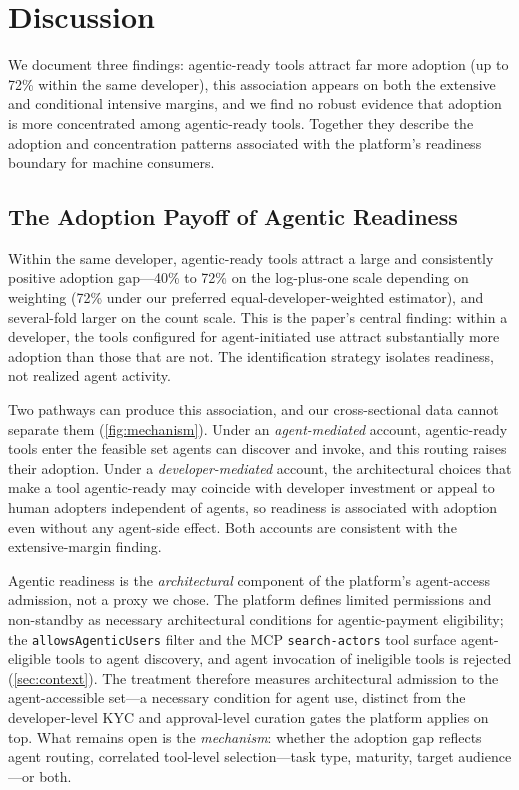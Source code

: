 \section{Discussion}
\label{sec:discussion}

We document three findings: agentic-ready tools attract far more adoption
(up to 72\% within the same developer), this association appears on both the
extensive and conditional intensive margins, and we find no robust evidence
that adoption is more concentrated among agentic-ready tools. Together they
describe the adoption and concentration patterns associated with the platform's
readiness boundary for machine consumers.

\subsection{The Adoption Payoff of Agentic Readiness}
\label{sec:discussion:gap}

Within the same developer, agentic-ready tools attract a large and consistently
positive adoption gap---40\% to 72\% on the log-plus-one scale depending on
weighting (72\% under our preferred equal-developer-weighted estimator), and
several-fold larger on the count scale. This is the paper's central finding:
within a developer, the tools configured for agent-initiated use attract
substantially more adoption
than those that are not. The identification strategy isolates readiness, not realized agent activity.

Two pathways can produce this association, and our cross-sectional data cannot
separate them (\autoref{fig:mechanism}). Under an \emph{agent-mediated}
account, agentic-ready tools enter the feasible set agents can discover and
invoke, and this routing raises their adoption. Under a
\emph{developer-mediated} account, the architectural choices that make a tool
agentic-ready may coincide with developer investment or appeal to human
adopters independent of agents, so readiness is associated with adoption even
without any agent-side effect. Both accounts are consistent with the
extensive-margin finding.

Agentic readiness is the \emph{architectural} component of the platform's
agent-access admission, not a proxy we chose. The platform defines limited
permissions and non-standby as necessary architectural conditions for
agentic-payment eligibility; the \texttt{allowsAgenticUsers} filter and the MCP
\texttt{search-actors} tool surface agent-eligible tools to agent discovery, and
agent invocation of ineligible tools is rejected (\autoref{sec:context}). The
treatment therefore measures architectural admission to the agent-accessible
set---a necessary condition for agent use, distinct from the developer-level KYC
and approval-level curation gates the platform applies on top. What remains open
is the \emph{mechanism}: whether the adoption gap reflects agent routing,
correlated tool-level selection---task type, maturity, target audience---or both.

